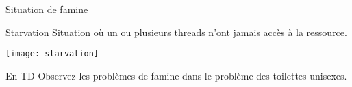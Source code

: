 
\begingroup

\begin{frame}{Situation de famine}

  \begin{block}{Starvation}
    Situation où un ou  plusieurs threads n'ont \alert{jamais accès}
    à la ressource.
  \end{block}

  \begin{center}
    \texttt{[image: starvation]}
  \end{center}      

  \begin{alertblock}{En TD}
    Observez les problèmes de famine dans le problème des toilettes unisexes.
  \end{alertblock}

\end{frame}

\endgroup
\endinput
